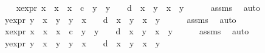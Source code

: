 \begin{isabellebody}
\isanewline
\ \ \isamarkupfalse%
\ x{}{\isacharprime}{\isacharunderscore}expr{\isacharcolon}\ {\isachardoublequoteopen}x{}{\isacharprime}\ {\isacharequal}\ {\isacharparenleft}x{}\ {\isacharasterisk}\ x{}\ {\isacharminus}\ c\ {\isacharasterisk}\ y{}\ {\isacharasterisk}\ y{}{\isacharparenright}\ {\isacharslash}\ {\isacharparenleft}{}\ {\isacharminus}\ d\ {\isacharasterisk}\ x{}\ {\isacharasterisk}\ y{}\ {\isacharasterisk}\ x{}\ {\isacharasterisk}\ y{}{\isacharparenright}{\isachardoublequoteclose}\isanewline
\ \ \ \ \isamarkupfalse%
\ assms{\isacharparenleft}{}{\isacharcomma}{}{\isacharparenright}\ \isamarkupfalse%
\ auto\isanewline
\ \ \isamarkupfalse%
\ y{}{\isacharprime}{\isacharunderscore}expr{\isacharcolon}\ {\isachardoublequoteopen}y{}{\isacharprime}\ {\isacharequal}\ {\isacharparenleft}x{}\ {\isacharasterisk}\ y{}\ {\isacharplus}\ y{}\ {\isacharasterisk}\ x{}{\isacharparenright}\ {\isacharslash}\ {\isacharparenleft}{}\ {\isacharplus}\ d\ {\isacharasterisk}\ x{}\ {\isacharasterisk}\ y{}\ {\isacharasterisk}\ x{}\ {\isacharasterisk}\ y{}{\isacharparenright}{\isachardoublequoteclose}\isanewline
\ \ \ \ \isamarkupfalse%
\ assms{\isacharparenleft}{}{\isacharcomma}{}{\isacharparenright}\ \isamarkupfalse%
\ auto\isanewline
\ \ \isamarkupfalse%
\ x{}{\isacharprime}{\isacharunderscore}expr{\isacharcolon}\ {\isachardoublequoteopen}x{}{\isacharprime}\ {\isacharequal}\ {\isacharparenleft}x{}\ {\isacharasterisk}\ x{}\ {\isacharminus}\ c\ {\isacharasterisk}\ y{}\ {\isacharasterisk}\ y{}{\isacharparenright}\ {\isacharslash}\ {\isacharparenleft}{}\ {\isacharminus}\ d\ {\isacharasterisk}\ x{}\ {\isacharasterisk}\ y{}\ {\isacharasterisk}\ x{}\ {\isacharasterisk}\ y{}{\isacharparenright}{\isachardoublequoteclose}\isanewline
\ \ \ \ \isamarkupfalse%
\ assms{\isacharparenleft}{}{\isacharcomma}{}{\isacharparenright}\ \isamarkupfalse%
\ auto\isanewline
\ \ \isamarkupfalse%
\ y{}{\isacharprime}{\isacharunderscore}expr{\isacharcolon}\ {\isachardoublequoteopen}y{}{\isacharprime}\ {\isacharequal}\ {\isacharparenleft}x{}\ {\isacharasterisk}\ y{}\ {\isacharplus}\ y{}\ {\isacharasterisk}\ x{}{\isacharparenright}\ {\isacharslash}\ {\isacharparenleft}{}\ {\isacharplus}\ d\ {\isacharasterisk}\ x{}\ {\isacharasterisk}\ y{}\ {\isacharasterisk}\ x{}\ {\isacharasterisk}\ y{}{\isacharparenright}{\isachardoublequoteclose}\isanewline

\end{isabellebody}
